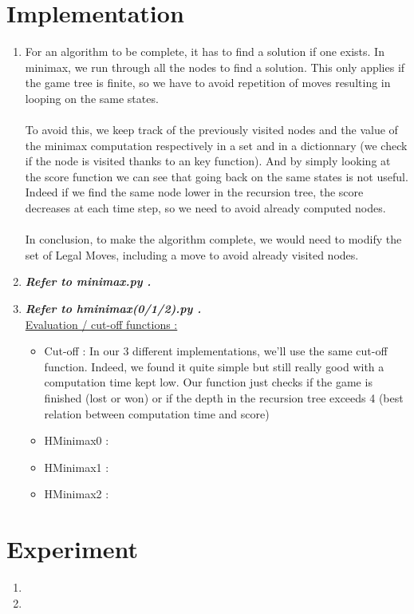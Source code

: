 \documentclass{article}
\begin{document}
\section{Implementation}

\begin{enumerate}[label=\alph*.,leftmargin=*]
    \item For an algorithm to be complete, it has to find a solution if one exists. In minimax, we run through all the nodes to find a solution. This only applies if the game tree is finite, so we have to avoid repetition of moves resulting in looping on the same states.
    \\\\
    To avoid this, we keep track of the previously visited nodes and the value of the minimax computation respectively in a set and in a dictionnary (we check if the node is visited thanks to an key function). And by simply looking at the score function we can see 
    that going back on the same states is not useful. Indeed if we find the same node lower in the recursion tree, the score decreases at each time step, so we need to avoid already computed nodes.
    \\\\
    In conclusion, to make the algorithm complete, we would need to modify the set of Legal Moves, including a move to avoid already visited nodes.
    \item \textbf{\textit{Refer to minimax.py .}}
    \item \textbf{\textit{Refer to hminimax(0/1/2).py .}}
    \\\underline{Evaluation / cut-off functions :}
    \begin{itemize}
        \item Cut-off : In our 3 different implementations, we'll use the same cut-off function. Indeed, we found it quite simple but still really good with a computation time kept low. 
        Our function just checks if the game is finished (lost or won) or if the depth in the recursion tree exceeds 4 (best relation between computation time and score)
        \item HMinimax0 : 
        \item HMinimax1 :
        \item HMinimax2 : 
    \end{itemize}
\end{enumerate}

\section{Experiment}

\begin{enumerate}[label=\alph*.,leftmargin=*]
    \item
    \item
\end{enumerate}



\end{document}
